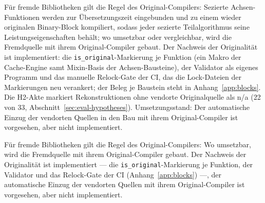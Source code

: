 \begin{nurlang}
Für fremde Bibliotheken gilt die Regel des Original-Compilers: Sezierte Achsen-Funktionen werden zur
Übersetzungszeit eingebunden und zu einem wieder originalen Binary-Block kompiliert, sodass jeder
sezierte Teilalgorithmus seine Leistungseigenschaften behält; wo umsetzbar oder vergleichbar, wird die
Fremdquelle mit ihrem Original-Compiler gebaut. Der Nachweis der Originalität ist implementiert: die
\texttt{is\_original}-Markierung je Funktion (ein Makro der Cache-Engine samt Mixin-Basis der
Achsen-Bausteine), der Validator als eigenes Programm und das manuelle Relock-Gate der CI, das die
Lock-Dateien der Markierungen neu verankert; der Beleg je Baustein steht in Anhang~\ref{app:blocks}.
Die H2-Akte markiert Rekonstruktionen ohne vendorte Originalquelle als n/a (22 von 33,
Abschnitt~\ref{sec:eval-hypotheses}). Umsetzungsstand: Der automatische Einzug der vendorten Quellen
in den Bau mit ihrem Original-Compiler ist vorgesehen, aber nicht implementiert.
\end{nurlang}
\begin{nurkurz}
Für fremde Bibliotheken gilt die Regel des Original-Compilers: Wo umsetzbar, wird die Fremdquelle mit
ihrem Original-Compiler gebaut. Der Nachweis der Originalität ist implementiert --- die
\texttt{is\_original}-Markierung je Funktion, der
Validator und das Relock-Gate der CI (Anhang~\ref{app:blocks}) ---, der automatische Einzug der vendorten
Quellen mit ihrem Original-Compiler ist vorgesehen, aber nicht implementiert.
\end{nurkurz}

